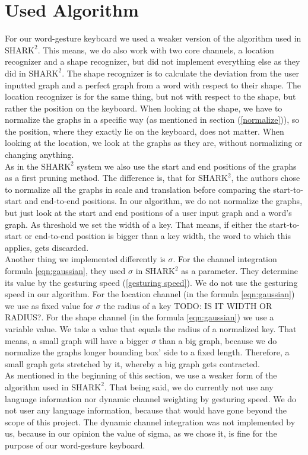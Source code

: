 \section{Used Algorithm}
For our word-gesture keyboard we used a weaker version of the algorithm used in $\text{SHARK}^2$. This means, we do also work with two core channels, a location recognizer and a shape recognizer, but did not implement everything else as they did in $\text{SHARK}^2$. The shape recognizer is to calculate the deviation from the user inputted graph and a perfect graph from a word with respect to their shape. The location recognizer is for the same thing, but not with respect to the shape, but rather the position on the keyboard. When looking at the shape, we have to normalize the graphs in a specific way (as mentioned in section (\ref{normalize})), so the position, where they exactly lie on the keyboard, does not matter. When looking at the location, we look at the graphs as they are, without normalizing or changing anything.\\
As in the $\text{SHARK}^2$ system we also use the start and end positions of the graphs as a first pruning method. The difference is, that for $\text{SHARK}^2$, the authors chose to normalize all the graphs in scale and translation before comparing the start-to-start and end-to-end positions. In our algorithm, we do not normalize the graphs, but just look at the start and end positions of a user input graph and a word's graph. As threshold we set the width of a key. That means, if either the start-to-start or end-to-end position is bigger than a key width, the word to which this applies, gets discarded.\\
Another thing we implemented differently is $\sigma$. For the channel integration formula \ref{eqn:gaussian}, they used $\sigma$ in $\text{SHARK}^2$ as a parameter. They determine its value by the gesturing speed (\ref{gesturing speed}). We do not use the gesturing speed in our algorithm. For the location channel (in the formula \ref{eqn:gaussian}) we use as fixed value for $\sigma$ the radius of a key TODO: IS IT WIDTH OR RADIUS?. For the shape channel (in the formula \ref{eqn:gaussian}) we use a variable value. We take a value that equals the radius of a normalized key. That means, a small graph will have a bigger $\sigma$ than a big graph, because we do normalize the graphs longer bounding box' side to a fixed length. Therefore, a small graph gets stretched by it, whereby a big graph gets contracted.\\
As mentioned in the beginning of this section, we use a weaker form of the algorithm used in $\text{SHARK}^2$. That being said, we do currently not use any language information nor dynamic channel weighting by gesturing speed. We do not user any language information, because that would have gone beyond the scope of this project. The dynamic channel integration was not implemented by us, because in our opinion the value of sigma, as we chose it, is fine for the purpose of our word-gesture keyboard.

